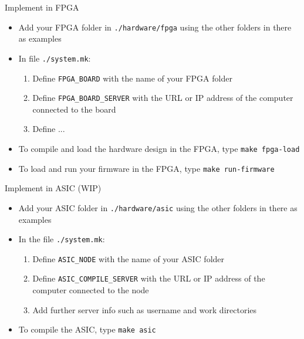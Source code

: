 \documentclass [xcolor=svgnames, t] {beamer}
\begin{document}
\begin{frame}{Implement in FPGA}
\begin{itemize}
  \item Add your FPGA folder in {\tt ./hardware/fpga} using the other folders in there as examples
  \item In file {\tt ./system.mk}:
  \begin{enumerate}
    \item Define {\tt FPGA\_BOARD} with the name of your FPGA folder
    \item Define {\tt FPGA\_BOARD\_SERVER} with the URL or IP address of the computer connected to the board
    \item Define ...
  \end{enumerate}
  \item To compile and load the hardware design in the FPGA, type {\tt make fpga-load}
  \item To load and run your firmware in the FPGA, type {\tt make run-firmware}
\end{itemize}
\end{frame}


\begin{frame}{Implement in ASIC (WIP)}
\begin{itemize}
  \item Add your ASIC folder in {\tt ./hardware/asic} using the other folders in there as examples
  \item In the file {\tt ./system.mk}:
  \begin{enumerate}
     \item Define {\tt ASIC\_NODE} with the name of your ASIC folder
     \item Define {\tt ASIC\_COMPILE\_SERVER} with the URL or IP address of the computer connected to the node
     \item Add further server info such as username and work directories
  \end{enumerate}
  \item To compile the ASIC, type {\tt make asic}
\end{itemize}
\end{frame}
\end{document}
